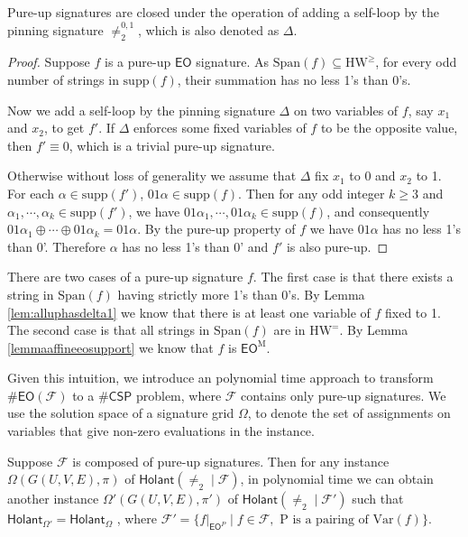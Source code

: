 \documentclass[a4paper,UKenglish,cleveref, autoref, thm-restate]{lipics-v2021}
\newcommand{\bi}[2]{\neq_2^{#1,#2}}
\newcommand{\hol}[0]{\textsf{Holant}}
\newcommand{\eo}[0]{\textsf{EO}}
\newcommand{\csp}[0]{\textsf{CSP}}
\newcommand{\eoe}[0]{\text{HW}^=}
\newcommand{\eog}[0]{\text{HW}^\geq}
\newcommand{\su}[0]{\text{supp}}
\newcommand{\pin}[0]{\Delta}
\newcommand{\eom}[1][\text{M}]{\textsf{EO}^{#1}}
\begin{document}
\begin{lemma}  \label{lem: allup closed under pin}
    Pure-up signatures are closed under the operation of adding a self-loop by the pinning signature $\bi{0}{1}$, which is also denoted as $\pin$. 
\end{lemma}
\begin{proof}
    Suppose $f$ is a pure-up $\eo$ signature. As $\text{Span}(f)\subseteq\eog$, for every odd number of strings in $\su(f)$, their summation has no less 1's than 0's.

    Now we add a self-loop by the pinning signature $\pin$ on two variables of $f$, say $x_1$ and $x_2$, to get $f'$. If $\pin$ enforces some fixed variables of $f$ to be the opposite value, then $f'\equiv0$, which is a trivial pure-up signature.

   Otherwise without loss of generality we assume that $\pin$ fix $x_1$ to 0 and $x_2$ to 1. For each $\alpha\in\su(f')$, $01\alpha\in\su(f)$. Then for any odd integer $k\geq3$ and $\alpha_1,\cdots,\alpha_k\in\su(f')$, we have  $01\alpha_1,\cdots,01\alpha_k\in\su(f)$, and consequently $01\alpha_1\oplus\cdots\oplus01\alpha_k=01\alpha$. By the pure-up property of $f$ we have $01\alpha$ has no less 1's than 0'. Therefore $\alpha$ has no less 1's than 0' and $f'$ is also pure-up.
\end{proof}

There are two cases of a pure-up signature $f$. The first case is that there exists a string in $\text{Span}(f)$ having strictly more 1's than 0's. By Lemma \ref{lem:alluphasdelta1} we know that there is at least one variable of $f$ fixed to 1. The second case is that all strings in $\text{Span}(f)$ are in $\eoe$. By Lemma \ref{lemmaaffineeosupport} we know that $f$ is $\eom$. 

Given this intuition, we introduce an polynomial time approach to transform $\#\eo(\mathcal{F})$ to a $\#\csp$ problem, where $\mathcal{F}$ contains only pure-up signatures. We use the solution space of a signature grid $\Omega$, to denote the set of assignments on variables that give non-zero evaluations in the instance.

\begin{lemma} \label{lem:alluptocsp}
    Suppose $\mathcal{F}$ is composed of pure-up signatures. Then for any instance $\Omega(G(U,V,E),\pi)$ of $\hol(\neq_2\mid\mathcal{F})$, in polynomial time we can obtain another instance $\Omega'(G(U,V,E),\pi')$ of $\hol(\neq_2\mid\mathcal{F}')$ such that $\hol_{\Omega'}=\hol_\Omega$ , where $\mathcal{F}'=\{f|_{\eom[P]}\mid f\in\mathcal{F},\text{ P is a pairing of Var}(f)\}$. 
    
    
\end{lemma}
\end{document}
